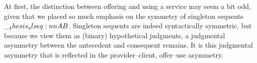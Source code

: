 





At first, the distinction between offering and using a service may seem a bit odd, given that we placed so much emphasis on the symmetry of singleton sequents $\slseq{A |- B}$.
Singleton sequents are indeed syntactically symmetric, but because we view them as (binary) hypothetical judgments, a judgmental asymmetry between the antecedent and consequent remains.
It is this judgmental asymmetry that is reflected in the provider--client, offer--use asymmetry.






